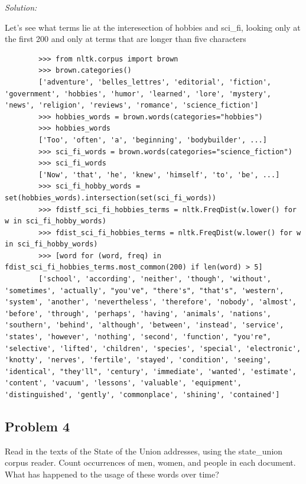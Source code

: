 \documentclass[11pt]{article}
\newenvironment{solution}{
	\vspace{10px}\noindent\emph{Solution:}
}{
	\vspace{10px}
}
\begin{document}
\begin{solution}
	
	Let's see what terms lie at the interesection of hobbies and sci\_fi, looking only at the first 200 and only at terms that are longer than five characters
	\begin{lstlisting}
		>>> from nltk.corpus import brown
		>>> brown.categories()
		['adventure', 'belles_lettres', 'editorial', 'fiction', 'government', 'hobbies', 'humor', 'learned', 'lore', 'mystery', 'news', 'religion', 'reviews', 'romance', 'science_fiction']
		>>> hobbies_words = brown.words(categories="hobbies")
		>>> hobbies_words
		['Too', 'often', 'a', 'beginning', 'bodybuilder', ...]
		>>> sci_fi_words = brown.words(categories="science_fiction")
		>>> sci_fi_words
		['Now', 'that', 'he', 'knew', 'himself', 'to', 'be', ...]
		>>> sci_fi_hobby_words = set(hobbies_words).intersection(set(sci_fi_words))
		>>> fdistf_sci_fi_hobbies_terms = nltk.FreqDist(w.lower() for w in sci_fi_hobby_words)
		>>> fdist_sci_fi_hobbies_terms = nltk.FreqDist(w.lower() for w in sci_fi_hobby_words)
		>>> [word for (word, freq) in fdist_sci_fi_hobbies_terms.most_common(200) if len(word) > 5]
		['school', 'according', 'neither', 'though', 'without', 'sometimes', 'actually', "you've", "there's", "that's", 'western', 'system', 'another', 'nevertheless', 'therefore', 'nobody', 'almost', 'before', 'through', 'perhaps', 'having', 'animals', 'nations', 'southern', 'behind', 'although', 'between', 'instead', 'service', 'states', 'however', 'nothing', 'second', 'function', "you're", 'selective', 'lifted', 'children', 'species', 'special', 'electronic', 'knotty', 'nerves', 'fertile', 'stayed', 'condition', 'seeing', 'identical', "they'll", 'century', 'immediate', 'wanted', 'estimate', 'content', 'vacuum', 'lessons', 'valuable', 'equipment', 'distinguished', 'gently', 'commonplace', 'shining', 'contained']
	\end{lstlisting}
	
\end{solution}  


\subsection*{Problem 4}
Read in the texts of the State of the Union addresses, using the state\_union corpus reader. Count occurrences of men, women, and people in each document. What has happened to the usage of these words over time?
\end{document}
